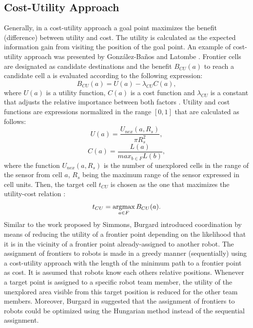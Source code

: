\subsection{Cost-Utility Approach}
Generally, in a cost-utility approach a goal point maximizes the benefit (difference) between utility and cost. The utility is calculated as the expected information gain from visiting the position of the goal point. An example of cost-utility approach was presented by González-Baños and Latombe \cite{GonzlezBaos2002}. Frontier cells are designated as candidate destinations and the benefit $B_{CU}(a)$ to reach a candidate cell a is evaluated according to the following expression:
\begin{equation}
B_{CU}(a) = U(a) - \lambda_{CU}C(a),
\label{equation:cost-utility}
\end{equation}
where $U(a)$ is a utility function, $C(a)$ is a cost function and $\lambda_{CU}$ is a constant that adjusts the relative importance between both factors \cite{Julia2012}. Utility and cost functions are expressions normalized in the range $\left[0, 1\right]$ that are calculated as follows:
\begin{equation}
U(a) = \frac{U_{nex}(a, R_{s})}{\pi R_{s}^{2}},
\end{equation}
\begin{equation}
C(a) = \frac{L(a)}{max_{b \in F}L(b)},
\end{equation}
where the function $U_{nex}(a, R_{s})$ is the number of unexplored cells in the range of the sensor from cell $a$, $R_{s}$ being the maximum range of the sensor expressed in cell units.
Then, the target cell $t_{CU}$ is chosen as the one that maximizes the utility-cost relation \cite{Julia2012}:
\begin{equation}
t_{CU} = \operatorname*{argmax}_{a \in F} B_{CU}(a).
\end{equation}
Similar to the work proposed by Simmons, Burgard \cite{Burgard2000} introduced coordination by means of reducing the utility of a frontier point depending on the likelihood that it is in the vicinity of a frontier point already-assigned to another robot. The assignment of frontiers to robots is made in a greedy manner (sequentially) using a cost-utility approach with the length of the minimum path to a frontier point as cost. It is assumed that robots know each others relative positions. 
Whenever a target point is assigned to a specific robot team member, the utility of the unexplored area visible from this target position is reduced for the other team members. 
Moreover, Burgard in \cite{Burgard2005} suggested that the assignment of frontiers to robots could be optimized using the Hungarian method \cite{Kuhn1955} instead of the sequential assignment.

